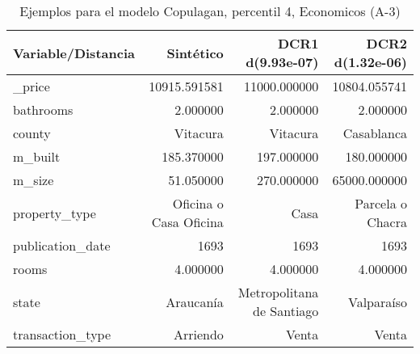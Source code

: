 \begin{table}[H]
\centering
\fontsize{10}{14}\selectfont
\caption{Ejemplos para el modelo Copulagan, percentil 4, Economicos (A-3)}
\label{table-example-economicos-a-3-copulagan-4p}
\begin{tabular}{|l|r|r|r|}
\hline
\rowcolor[gray]{0.8}
Variable/Distancia & Sintético & DCR1 d(9.93e-07) & DCR2 d(1.32e-06) \\
\hline \_price & \cellcolor[rgb]{0.9, 0.54, 0.52} 10915.591581 & 11000.000000 & 10804.055741 \\
\hline bathrooms & \cellcolor[rgb]{0.9, 0.54, 0.52} 2.000000 & \cellcolor[rgb]{0.9, 0.54, 0.52} 2.000000 & \cellcolor[rgb]{0.9, 0.54, 0.52} 2.000000 \\
\hline county & \cellcolor[rgb]{0.9, 0.54, 0.52} Vitacura & \cellcolor[rgb]{0.9, 0.54, 0.52} Vitacura & Casablanca \\
\hline m\_built & \cellcolor[rgb]{0.9, 0.54, 0.52} 185.370000 & 197.000000 & 180.000000 \\
\hline m\_size & \cellcolor[rgb]{0.9, 0.54, 0.52} 51.050000 & 270.000000 & 65000.000000 \\
\hline property\_type & \cellcolor[rgb]{0.9, 0.54, 0.52} Oficina o Casa Oficina & Casa & Parcela o Chacra \\
\hline publication\_date & \cellcolor[rgb]{0.9, 0.54, 0.52} 1693 & \cellcolor[rgb]{0.9, 0.54, 0.52} 1693 & \cellcolor[rgb]{0.9, 0.54, 0.52} 1693 \\
\hline rooms & \cellcolor[rgb]{0.9, 0.54, 0.52} 4.000000 & \cellcolor[rgb]{0.9, 0.54, 0.52} 4.000000 & \cellcolor[rgb]{0.9, 0.54, 0.52} 4.000000 \\
\hline state & \cellcolor[rgb]{0.9, 0.54, 0.52} Araucanía & Metropolitana de Santiago & Valparaíso \\
\hline transaction\_type & \cellcolor[rgb]{0.9, 0.54, 0.52} Arriendo & Venta & Venta \\
\hline
\end{tabular}
\end{table}
